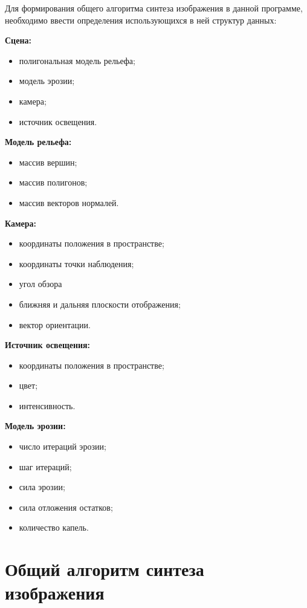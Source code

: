 Для формирования общего алгоритма синтеза изображения в данной
программе, необходимо ввести определения использующихся в ней структур
данных:

\textbf{Сцена:}
\begin{itemize}
    \item полигональная модель рельефа;
    \item модель эрозии;
    \item камера;
    \item источник освещения.
\end{itemize}

\textbf{Модель рельефа:}
\begin{itemize}
    \item массив вершин;
    \item массив полигонов;
    \item массив векторов нормалей.
\end{itemize}

\textbf{Камера:}
\begin{itemize}
    \item координаты положения в пространстве;
    \item координаты точки наблюдения;
    \item угол обзора
    \item ближняя и дальняя плоскости отображения;
    \item вектор ориентации.
\end{itemize}

\textbf{Источник освещения:}
\begin{itemize}
    \item координаты положения в пространстве;
    \item цвет;
    \item интенсивность.
\end{itemize}

\textbf{Модель эрозии:}
\begin{itemize}
    \item число итераций эрозии;
    \item шаг итераций;
    \item сила эрозии;
    \item сила отложения остатков;
    \item количество капель.
\end{itemize}

\section{Общий алгоритм синтеза изображения}

